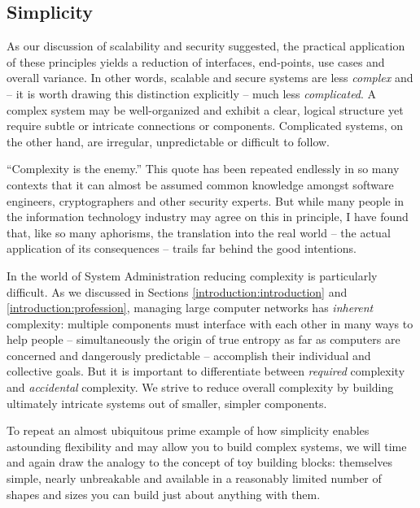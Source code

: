 \subsection{Simplicity}
\label{introduction:pillars:simplicity}

As our discussion of scalability and security
suggested, the practical application of these
principles yields a reduction of interfaces,
end-points, use cases and overall variance.  In other
words, scalable and secure systems are less {\em
complex} and -- it is worth drawing this distinction
explicitly -- much less {\em complicated}.  A complex
system may be well-organized and exhibit a clear,
logical structure yet require subtle or intricate
connections or components.  Complicated systems, on
the other hand, are irregular, unpredictable or
difficult to follow.

``Complexity is the enemy.'' This quote has been
repeated endlessly in so many contexts that it can
almost be assumed common knowledge amongst software
engineers, cryptographers and other security
experts\cite{intro:schneier-ce}.  But while many
people in the information technology industry may
agree on this in principle, I have found that, like so
many aphorisms, the translation into the real world --
the actual application of its consequences -- trails
far behind the good intentions.

In the world of System Administration reducing
complexity is particularly difficult.  As we discussed
in Sections \ref{introduction:introduction} and
\ref{introduction:profession}, managing large
computer networks has {\em inherent} complexity:
multiple components must interface with each other in
many ways to help people -- simultaneously the origin
of true entropy as far as computers are concerned and
dangerously predictable -- accomplish their individual
and collective goals.  But it is important to
differentiate between {\em required}
complexity and {\em
accidental}
complexity\cite{intro:brooks-mmm}.
We strive to reduce overall complexity by building
ultimately intricate systems out of smaller, simpler
components.

To repeat an almost ubiquitous prime example of how
simplicity enables astounding flexibility and may
allow you to build complex systems, we will time and
again draw the analogy to the concept of toy building
blocks: themselves simple, nearly unbreakable and
available in a reasonably limited number of shapes and
sizes you can build just about anything with them.

